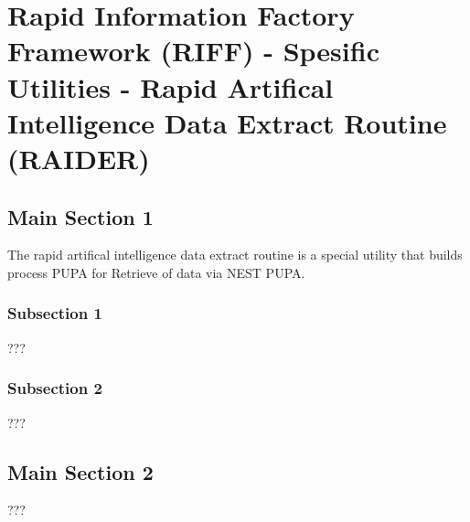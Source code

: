 
\chapter{Rapid Information Factory Framework (RIFF) - Spesific Utilities - Rapid Artifical Intelligence Data Extract Routine (RAIDER)} %

\label{Chapter42} %



\section{Main Section 1}

The rapid artifical intelligence data extract routine is a special utility that builds process PUPA for Retrieve of data via NEST PUPA.

\subsection{Subsection 1}

???


\subsection{Subsection 2}

???


\section{Main Section 2}

???
